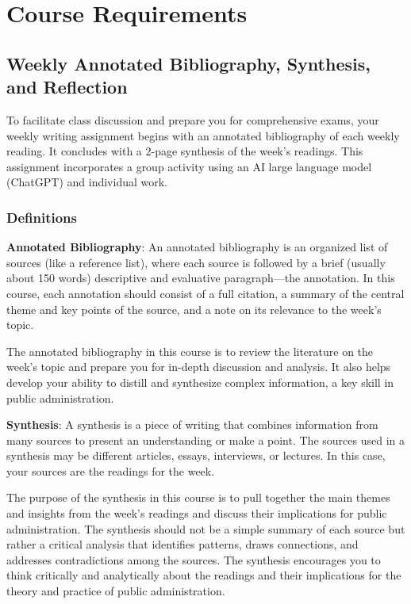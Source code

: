 \documentclass[12pt, letterpaper]{article}
\begin{document}
\section{Course Requirements}

\subsection{Weekly Annotated Bibliography, Synthesis, and Reflection}

To facilitate class discussion and prepare you for comprehensive exams, your weekly writing assignment begins with an annotated bibliography of each weekly reading. It concludes with a 2-page synthesis of the week’s readings. This assignment incorporates a group activity using an AI large language model (ChatGPT) and individual work.

\subsubsection*{Definitions}

\textbf{Annotated Bibliography}: An annotated bibliography is an organized list of sources (like a reference list), where each source is followed by a brief (usually about 150 words) descriptive and evaluative paragraph—the annotation. In this course, each annotation should consist of a full citation, a summary of the central theme and key points of the source, and a note on its relevance to the week’s topic.

The annotated bibliography in this course is to review the literature on the week’s topic and prepare you for in-depth discussion and analysis. It also helps develop your ability to distill and synthesize complex information, a key skill in public administration.

\textbf{Synthesis}: A synthesis is a piece of writing that combines information from many sources to present an understanding or make a point. The sources used in a synthesis may be different articles, essays, interviews, or lectures. In this case, your sources are the readings for the week.

The purpose of the synthesis in this course is to pull together the main themes and insights from the week’s readings and discuss their implications for public administration. The synthesis should not be a simple summary of each source but rather a critical analysis that identifies patterns, draws connections, and addresses contradictions among the sources. The synthesis encourages you to think critically and analytically about the readings and their implications for the theory and practice of public administration.
\end{document}
